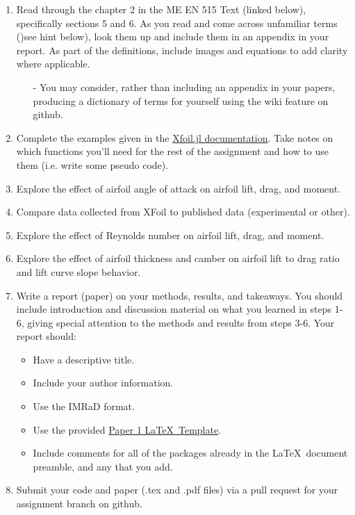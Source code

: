 \documentclass[12pt]{article}
\begin{document}
\begin{enumerate}
	\item Read  through the chapter 2 in the ME EN 515 Text (linked below), specifically sections 5 and 6.  As you read and come across unfamiliar terms ()see hint below), look them up and include them in an appendix in your report.  As part of the definitions, include images and equations to add clarity where applicable.
	\begin{itemize}
		\item[-] You may consider, rather than including an appendix in your papers, producing a dictionary of terms for yourself using the wiki feature on github.
	\end{itemize}
	\item Complete the examples given in the \href{https://flow.byu.edu/Xfoil.jl/stable/}{Xfoil.jl documentation}. Take notes on which functions you'll need for the rest of the assignment and how to use them (i.e. write some pseudo code). 
	\item Explore the effect of airfoil angle of attack on airfoil lift, drag, and moment.
	\item Compare data collected from XFoil to published data (experimental or other). 
	\item Explore the effect of Reynolds number on airfoil lift, drag, and moment.
	\item Explore the effect of airfoil thickness and camber on airfoil lift to drag ratio and lift curve slope behavior.
	\item Write a report (paper) on your methods, results, and takeaways. You should include introduction and discussion material on what you learned in steps 1-6, giving special attention to the methods and results from steps 3-6. Your report should:
	\begin{itemize}
		\item Have a descriptive title.
		\item Include your author information.
		\item Use the IMRaD format.
		\item Use the provided \href{https://github.com/byuflowlab/undergrad-onboarding/tree/497R/497R/latex_templates/paper1_aiaa}{Paper 1 \LaTeX~Template}.
		\item Include comments for all of the packages already in the \LaTeX~document preamble, and any that you add. 
	\end{itemize}
	\item Submit your code and paper (.tex and .pdf files) via a pull request for your assignment branch on github.
\end{enumerate}
\end{document}

